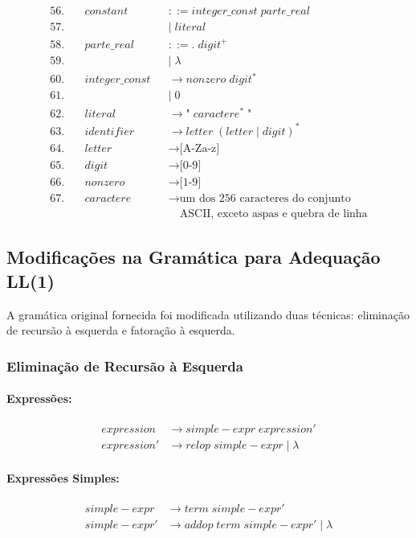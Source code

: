 \documentclass[12pt,a4paper]{article}
\begin{document}
\begin{align*}
56.&\quad constant &&::= \mathit{integer\_const} \; \mathit{parte\_real} \\
57.&\quad &&\mid \; literal \\
58.&\quad \mathit{parte\_real} &&::= \text{.} \; digit^{+} \\
59.&\quad &&\mid \; \lambda \\
60.&\quad \mathit{integer\_const} &&\to nonzero \; digit^{*} \\
61.&\quad &&\mid \; \text{0} \\
62.&\quad literal &&\to \text{"} \; caractere^{*} \; \text{"} \\
63.&\quad identifier &&\to letter \; (letter \mid digit)^{*} \\
64.&\quad letter &&\to \text{[A-Za-z]} \\
65.&\quad digit &&\to \text{[0-9]} \\
66.&\quad nonzero &&\to \text{[1-9]} \\
67.&\quad caractere &&\to \text{um dos 256 caracteres do conjunto} \\
&\quad &&\quad \text{ASCII, exceto aspas e quebra de linha}
\end{align*}

\subsection{Modificações na Gramática para Adequação LL(1)}

A gramática original fornecida foi modificada utilizando duas técnicas: eliminação de
recursão à esquerda e fatoração à esquerda.

\subsubsection{Eliminação de Recursão à Esquerda}

\paragraph{Expressões:}
\begin{align*}
expression      &\to simple\!-\!expr \; expression' \\
expression'     &\to relop \; simple\!-\!expr \mid \lambda
\end{align*}

\paragraph{Expressões Simples:}
\begin{align*}
simple\!-\!expr    &\to term \; simple\!-\!expr' \\
simple\!-\!expr'   &\to addop \; term \; simple\!-\!expr' \mid \lambda
\end{align*}
\end{document}

